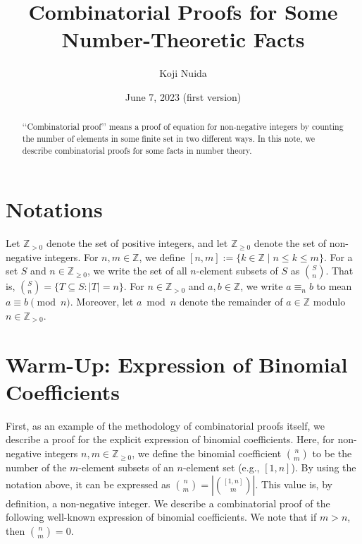 ﻿\documentclass{article}
\title{Combinatorial Proofs for Some Number-Theoretic Facts}
\author{Koji Nuida}
\date{June 7, 2023 (first version)}
\theoremstyle{definition}
\begin{document}
\maketitle
\vspace*{-2em}

\begin{abstract}
    \lq\lq Combinatorial proof\rq\rq{} means a proof of equation for non-negative integers by counting the number of elements in some finite set in two different ways.
    In this note, we describe combinatorial proofs for some facts in number theory.
\end{abstract}


\section*{Notations}

Let $\mathbb{Z}_{>0}$ denote the set of positive integers, and let $\mathbb{Z}_{\geq 0}$ denote the set of non-negative integers.
For $n,m \in \mathbb{Z}$, we define $[n,m] := \{ k \in \mathbb{Z} \mid n \leq k \leq m \}$.
For a set $S$ and $n \in \mathbb{Z}_{\geq 0}$, we write the set of all $n$-element subsets of $S$ as $\binom{S}{n}$.
That is, $\binom{S}{n} = \{ T \subseteq S : |T| = n \}$.
For $n \in \mathbb{Z}_{>0}$ and $a,b \in \mathbb{Z}$, we write $a \equiv_n b$ to mean $a \equiv b \pmod{n}$.
Moreover, let $a \bmod n$ denote the remainder of $a \in \mathbb{Z}$ modulo $n \in \mathbb{Z}_{>0}$.


\section{Warm-Up: Expression of Binomial Coefficients}

First, as an example of the methodology of combinatorial proofs itself, we describe a proof for the explicit expression of binomial coefficients.
Here, for non-negative integers $n,m \in \mathbb{Z}_{\geq 0}$, we define the binomial coefficient $\binom{n}{m}$ to be the number of the $m$-element subsets of an $n$-element set (e.g., $[1,n]$).
By using the notation above, it can be expressed as $\binom{n}{m} = | \binom{[1,n]}{m} |$.
This value is, by definition, a non-negative integer.
We describe a combinatorial proof of the following well-known expression of binomial coefficients.
We note that if $m > n$, then $\binom{n}{m} = 0$.
\end{document}

